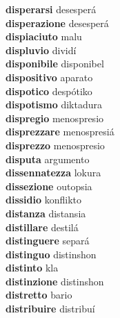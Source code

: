 \textbf{disperarsi } desesperá \\
\textbf{disperazione } desesperá \\
\textbf{dispiaciuto } malu \\
\textbf{displuvio } dividí \\
\textbf{disponibile } disponibel \\
\textbf{dispositivo } aparato \\
\textbf{dispotico } despótiko \\
\textbf{dispotismo } diktadura \\
\textbf{dispregio } menospresio \\
\textbf{disprezzare } menospresiá \\
\textbf{disprezzo } menospresio \\
\textbf{disputa } argumento \\
\textbf{dissennatezza } lokura \\
\textbf{dissezione } outopsia \\
\textbf{dissidio } konflikto \\
\textbf{distanza } distansia \\
\textbf{distillare } destilá \\
\textbf{distinguere } separá \\
\textbf{distinguo } distinshon \\
\textbf{distinto } kla \\
\textbf{distinzione } distinshon \\
\textbf{distretto } bario \\
\textbf{distribuire } distribuí \\
